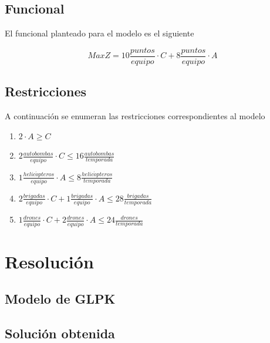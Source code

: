 \documentclass[12pt]{article}
\begin{document}
\subsection{Funcional}

El funcional planteado para el modelo es el siguiente

$$Max Z = 10\frac{puntos}{equipo} \cdot C + 8\frac{puntos}{equipo} \cdot A$$

\subsection{Restricciones}

A continuación se enumeran las restricciones correspondientes al modelo

\begin{enumerate}[label=(\textbf{\arabic*})]
    \item $2 \cdot A \geq C$
    \item $2 \frac{autobombas}{equipo} \cdot C \leq 16 \frac{autobombas}{temporada}$
    \item $1 \frac{helic\acute{o}pteros}{equipo} \cdot A \leq 8 \frac{helic\acute{o}pteros}{temporada}$
    \item $2 \frac{brigadas}{equipo} \cdot C + 1 \frac{brigadas}{equipo} \cdot A \leq 28 \frac{brigadas}{temporada}$
    \item $1 \frac{drones}{equipo} \cdot C + 2 \frac{drones}{equipo} \cdot A \leq 24 \frac{drones}{temporada}$
\end{enumerate}

\pagebreak
\section{Resolución}

\subsection{Modelo de GLPK}



\subsection{Solución obtenida}


\end{document}
